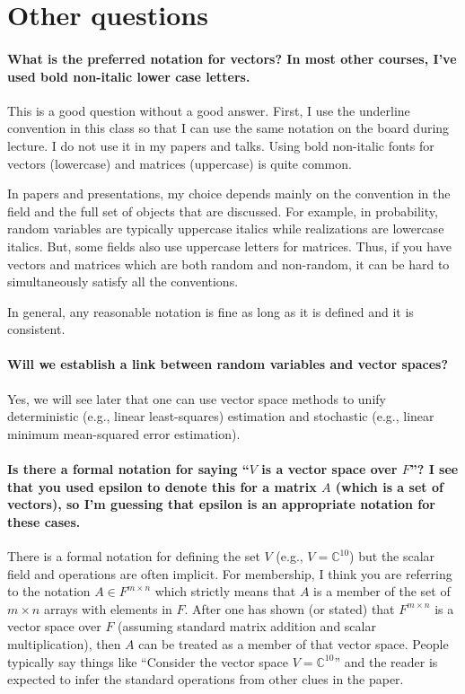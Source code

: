 \documentclass[10pt,english]{article}
\begin{document}
\section{Other questions}

\paragraph{What is the preferred notation for vectors? In most other courses, I've used bold non-italic lower case letters.}
This is a good question without a good answer.
First, I use the underline convention in this class so that I can use the same notation on the board during lecture.
I do not use it in my papers and talks.
Using bold non-italic fonts for vectors (lowercase) and matrices (uppercase) is quite common.

In papers and presentations, my choice depends mainly on the convention in the field and the full set of objects that are discussed.
For example, in probability, random variables are typically uppercase italics while realizations are lowercase italics.
But, some fields also use uppercase letters for matrices.
Thus, if you have vectors and matrices which are both random and non-random, it can be hard to simultaneously satisfy all the conventions.

In general, any reasonable notation is fine as long as it is defined and it is consistent.

\paragraph{Will we establish a link between random variables and vector spaces?}

Yes, we will see later that one can use vector space methods to unify deterministic (e.g., linear least-squares) estimation and stochastic (e.g., linear minimum mean-squared error estimation).

\paragraph{Is there a formal notation for saying ``$V$ is a vector space over $F$''? I see that you used epsilon to denote this for a matrix $A$ (which is a set of vectors), so I'm guessing that epsilon is an appropriate notation for these cases.}

There is a formal notation for defining the set $V$ (e.g., $V=\mathbb{C}^{10}$) but the scalar field and operations are often implicit.
For membership, I think you are referring to the notation $A \in F^{m\times n}$ which strictly means that $A$ is a member of the set of $m\times n$ arrays with elements in $F$.
After one has shown (or stated) that $F^{m\times n}$ is a vector space over $F$ (assuming standard matrix addition and scalar multiplication), then $A$ can be treated as a member of that vector space.
People typically say things like ``Consider the vector space $V=\mathbb{C}^{10}$'' and the reader is expected to infer the standard operations from other clues in the paper.
\end{document}

